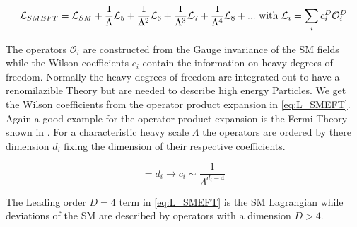 \documentclass[../Bachelorarbeit.tex]{subfiles}
\begin{document}
\begin{equation}
    \mathcal{L}_{SMEFT} = \mathcal{L}_{SM} + \frac{1}{\Lambda} \mathcal{L}_{5} + \frac{1}{\Lambda^2} \mathcal{L}_{6} + \frac{1}{\Lambda^3} \mathcal{L}_{7} + \frac{1}{\Lambda^4} \mathcal{L}_{8} + ... \textnormal{ with } \mathcal{L}_{i} = \sum_{i} c_{i}^{D} \mathcal{O}_{i}^{D}
    \label{eq:L_SMEFT}
\end{equation}

The operators $\mathcal{O}_{i}$ are constructed from the Gauge invariance of the SM fields while the Wilson coefficients $c_{i}$ contain the information on heavy degrees of freedom.
Normally the heavy degrees of freedom are integrated out to have a renomilazible Theory but are needed to describe high energy Particles.
We get the Wilson coefficients from the operator product expansion in \ref{eq:L_SMEFT}. Again a good example for the operator product expansion is the Fermi Theory shown in \cite{Pich.1998}.
For a characteristic heavy scale $\Lambda$ the operators are ordered by there dimension $d_{i}$ fixing the dimension of their respective coefficients.

\begin{equation}
    [\mathcal{O}_i] = d_{i} \longrightarrow c_{i} \sim \frac{1}{\Lambda^{d_{i}-4}}
\end{equation}

The Leading order $D = 4$ term in \ref{eq:L_SMEFT} is the SM Lagrangian while deviations of the SM are described by operators with a dimension $D>4$.
\end{document}

